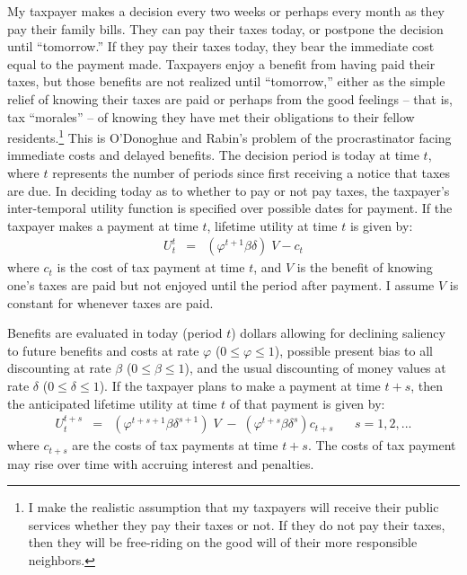 My taxpayer makes a decision every two weeks or perhaps every month
as they pay their family bills.  They can pay their taxes today, or
postpone the decision until ``tomorrow.''  If they pay their taxes
today, they bear the immediate cost equal to the payment made.
Taxpayers enjoy a benefit from having paid their taxes, but those
benefits are not realized until ``tomorrow,'' either as the simple
relief of knowing their taxes are paid or perhaps from the good
feelings -- that is, tax ``morales'' -- of knowing they have met their
obligations to their fellow residents.\footnote{ I make the realistic
  assumption that my taxpayers will receive their public services
  whether they pay their taxes or not.  If they do not pay their
  taxes, then they will be free-riding on the good will of their more
  responsible neighbors.  }  This is O'Donoghue and Rabin's problem of
the procrastinator facing immediate costs and delayed benefits. The
decision period is today at time $t$, where $t$ represents the number
of periods since first receiving a notice that taxes are due.  In
deciding today as to whether to pay or not pay taxes, the taxpayer's
inter-temporal utility function is specified over possible dates for
payment. If the taxpayer makes a payment at time $t$, lifetime
utility at time $t$ is given by:
\begin{eqnarray}\label{eq1}
U_t^t  &=& (\varphi^{t+1} \beta \delta) \;  V - c_ t 
\end{eqnarray}
where $c_t$ is the cost of tax payment at time $t$, and $V$ is the
benefit of knowing one's taxes are paid but not enjoyed until the
period after payment.  I assume $V$ is constant for whenever taxes
are paid. 

Benefits are evaluated in today (period $t$) dollars allowing for
declining saliency to future benefits and costs at rate $\varphi$ ($0
\le \varphi \le 1$), possible present bias to all discounting at rate
$\beta$ ($0 \le \beta \le 1$), and the usual discounting of money
values at rate $\delta$ ($0 \le \delta\le 1$).  If the taxpayer plans
to make a payment at time $t + s$, then the anticipated lifetime
utility at time $t$ of that payment is given by:
\begin{eqnarray}\label{eq2}
U_t^{t+s} &=& (\varphi^{t+s+1} \beta \delta^{s+1}) \; V \; - \; (\varphi^{t+s}
\beta \delta^{s}) c_ {t+s} \; \; \; \; \; \; s=1,2, ...
\end{eqnarray}
where $c_{t+s}$ are the costs of tax payments at time $t+s$. The costs
of tax payment may rise over time with accruing interest and
penalties.

